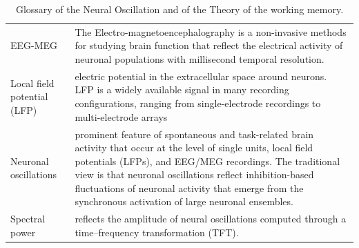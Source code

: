 \begin{table}[ht]
    \centering
    \begin{tabular}{@{}| p{4cm}|p{9cm}| @{}}
        \hline
        EEG-MEG                     & The Electro-magnetoencephalography is a non-invasive methods for studying brain function that reflect the electrical activity of neuronal populations with millisecond temporal resolution.                                                                                                                                                             \\

        Local field potential (LFP) & electric potential in the extracellular space around neurons. LFP is a widely available signal in many recording configurations, ranging from single-electrode recordings to multi-electrode arrays                                                                                                                                                     \\
        Neuronal oscillations       & prominent feature of spontaneous and task-related brain activity that occur at the level of single units, local field potentials (LFPs), and EEG/MEG recordings. The traditional view is that neuronal oscillations reflect inhibition-based fluctuations of neuronal activity that emerge from the synchronous activation of large neuronal ensembles. \\
        Spectral power              & reflects the amplitude of neural oscillations computed through a time–frequency transformation (TFT).                                                                                                                                                                                                                                                   \\
        \hline
    \end{tabular}
    \caption{Glossary of the Neural Oscillation and of the Theory of the working memory. \cite{roux2014working}}
    \label{Tab:Glossary_theory}
\end{table}

